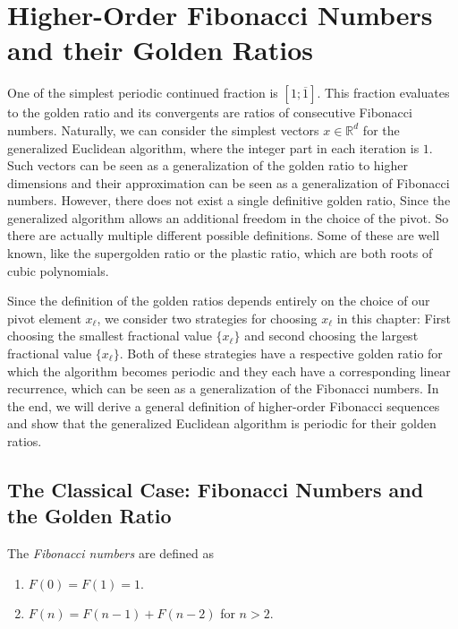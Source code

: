 \chapter{Higher-Order Fibonacci Numbers and their Golden Ratios}
\label{ch:fibonacci}

One of the simplest periodic continued fraction is $[1; \overline{1}]$.
This fraction evaluates to the golden ratio and its convergents are ratios of
consecutive Fibonacci numbers.
Naturally, we can consider the simplest vectors $x ∈ ℝ^d$ for the generalized
Euclidean algorithm, where the integer part in each iteration is $1$.
Such vectors can be seen as a generalization of the golden
ratio to higher dimensions and their approximation can be seen as a
generalization of Fibonacci numbers.
However, there does not exist a single definitive golden ratio,
Since the generalized algorithm allows an additional freedom in the choice of the pivot.
So there are actually multiple different possible definitions.
Some of these are well known, like the supergolden ratio or the plastic ratio,
which are both roots of cubic polynomials.

Since the definition of the golden ratios depends entirely on the choice of our
pivot element $x_ℓ$, we consider two strategies for choosing $x_ℓ$ in this
chapter: First choosing the smallest fractional value $\{x_ℓ\}$ and second
choosing the largest fractional value $\{x_ℓ\}$.
Both of these strategies have a respective golden ratio for which the algorithm
becomes periodic and they each have a corresponding linear recurrence, which
can be seen as a generalization of the Fibonacci numbers.
In the end, we will derive a general definition of higher-order Fibonacci
sequences and show that the generalized Euclidean algorithm is periodic for
their golden ratios.

\section{The Classical Case: Fibonacci Numbers and the Golden Ratio}

\begin{definition}
  The \emph{Fibonacci numbers} are defined as
  \begin{enumerate}
    \item $F(0) = F(1) = 1$.
    \item $F(n) = F(n - 1) + F(n - 2)$ for $n > 2$.
  \end{enumerate}
\end{definition}

